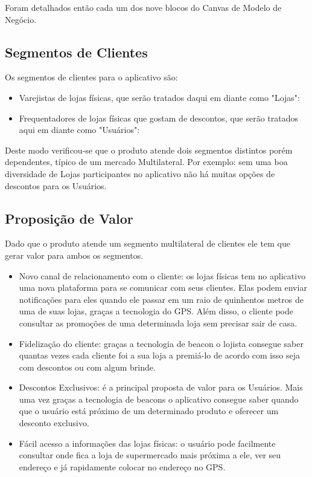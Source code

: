 Foram detalhados então cada um dos nove blocos do Canvas de Modelo de Negócio.
\subsection{Segmentos de Clientes}
\label{cha:segmentos_de_clientes}
Os segmentos de clientes para o aplicativo são:
\begin{itemize}
\item Varejistas de lojas físicas, que serão tratados daqui em diante como "Lojas": 
\item Frequentadores de lojas físicas que gostam de descontos, que serão tratados aqui em diante como "Usuários": 
\end{itemize}
Deste modo verificou-se que o produto atende dois segmentos distintos porém dependentes, típico de um mercado Multilateral. Por exemplo: sem uma boa diversidade de Lojas participantes no aplicativo não há muitas opções de descontos para os Usuários.

\subsection{Proposição de Valor}
\label{cha:proposicao_de_valor}
Dado que o produto atende um segmento multilateral de clientes ele tem que gerar valor para ambos os segmentos.
\begin{itemize}
\item Novo canal de relacionamento com o cliente: os lojas físicas tem no aplicativo uma nova plataforma para se comunicar com seus clientes. Elas podem enviar notificações para eles quando ele passar em um raio de quinhentos metros de uma de suas lojas, graças a tecnologia do GPS. Além disso, o cliente pode consultar as promoções de uma determinada loja sem precisar sair de casa.
\item Fidelização do cliente: graças a tecnologia de beacon o lojista consegue saber quantas vezes cada cliente foi a sua loja a premiá-lo de acordo com isso seja com descontos ou com algum brinde.
\item Descontos Exclusivos: é a principal proposta de valor para os Usuários. Mais uma vez graças a tecnologia de beacons o aplicativo consegue saber quando que o usuário está próximo de um determinado produto e oferecer um desconto exclusivo.
\item Fácil acesso a informações das lojas físicas: o usuário pode facilmente consultar onde fica a loja de supermercado mais próxima a ele, ver seu endereço e já rapidamente colocar no endereço no GPS.
\end{itemize}

